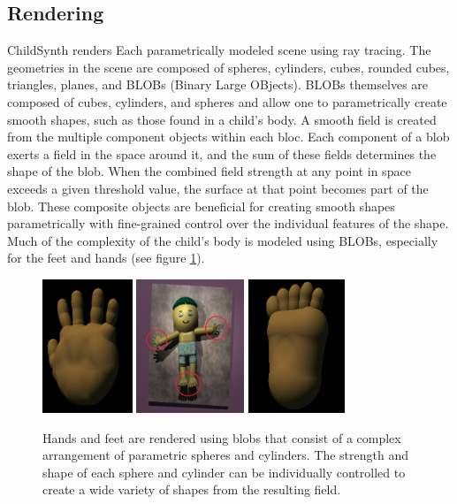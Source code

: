 \documentclass{article}
\begin{document}
\subsection{Rendering}

ChildSynth renders Each parametrically modeled scene using ray tracing. The geometries in the scene are composed of spheres, cylinders, cubes, rounded cubes, triangles, planes, and BLOBs (Binary Large OBjects). BLOBs themselves are composed of cubes, cylinders, and spheres and allow one to parametrically create smooth shapes, such as those found in a child's body. A smooth field is created from the multiple component objects within each bloc. Each component of a blob exerts a field in the space around it, and the sum of these fields determines the shape of the blob. When the combined field strength at any point in space exceeds a given threshold value, the surface at that point becomes part of the blob. These composite objects are beneficial for creating smooth shapes parametrically with fine-grained control over the individual features of the shape. Much of the complexity of the child's body is modeled using BLOBs, especially for the feet and hands (see figure \ref{fig:hand_foot}). 

\begin{figure}[htbp]
    \centering
    \includegraphics[height=4cm]{plots/hand.png}
    \includegraphics[height=4cm]{plots/back.png}
    \includegraphics[height=4cm]{plots/foot.png}
    \caption{Hands and feet are rendered using blobs that consist of a complex arrangement of parametric spheres and cylinders. The strength and shape of each sphere and cylinder can be individually controlled to create a wide variety of shapes from the resulting field.}
    \label{fig:hand_foot}
\end{figure}
\end{document}
